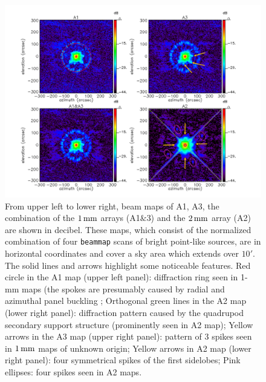 \begin{figure}[!thbp]
\begin{center}
  \includegraphics[trim=0.5cm 0.5cm 1cm 0cm, clip=true, width=\linewidth]{Figures/Beams_features.pdf}
\caption[Noticeable features of NIKA2 beam pattern.]{From upper left
  to lower right, beam maps of A1, A3,
  the combination of the $1\,\rm{mm}$ arrays (A1$\&$3) and the
  $2\,\rm{mm}$ array (A2) are shown in decibel. These maps, which
  consist of the normalized combination of four {\tt beammap} scans of
  bright point-like sources, are in horizontal coordinates and cover a
  sky area which extends over $10'$. %
  The solid lines and arrows highlight some noticeable features.
  Red circle in the A1 map (upper left panel): diffraction ring seen in 1-mm maps
  (the spokes are presumably caused by radial and azimuthal panel
  buckling \citep{Greve2010}; Orthogonal green lines in the A2 map
  (lower right panel): diffraction
  pattern caused by the quadrupod secondary support structure (prominently
  seen in A2 map); Yellow arrows in the A3 map (upper right panel):
  pattern of 3 spikes seen in $1\,\rm{mm}$ maps of unknown origin; Yellow
  arrows in A2 map (lower right panel): four symmetrical spikes of the
  first sidelobes; Pink ellipses: four spikes seen in A2 maps.}
\label{fig:features}
\end{center}
\end{figure}

